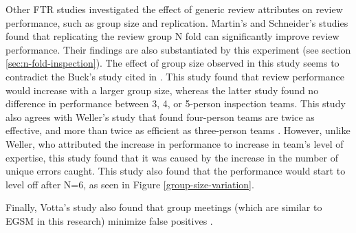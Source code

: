 Other FTR studies investigated the effect of generic review attributes
on review performance, such as group size and replication. 
Martin's and Schneider's studies \cite{Martin90,Schneider92}
found that replicating the review group N fold can significantly
improve review performance. Their findings
are also substantiated by this experiment (see section
\ref{sec:n-fold-inspection}).  
The effect of group size observed in this study seems to contradict the
Buck's study cited in \cite{Bisant89}. 
This study found that review performance would increase with a larger
group size, whereas the latter study found no
difference in performance between 3, 4, or 5-person inspection teams.
This study also agrees with Weller's study that found four-person
teams are twice 
as effective, and more than twice as efficient as three-person teams
\cite{Weller93}. However, unlike Weller, who attributed the
increase in performance to increase in team's level of expertise, this
study found that it was caused by the increase in the number of unique
errors caught. This study also found that the performance would start
to level off after N=6, as seen in Figure \ref{group-size-variation}.

Finally, Votta's study also found that  group meetings (which are
similar to EGSM in this research) minimize
false positives \cite{Votta93}. 



